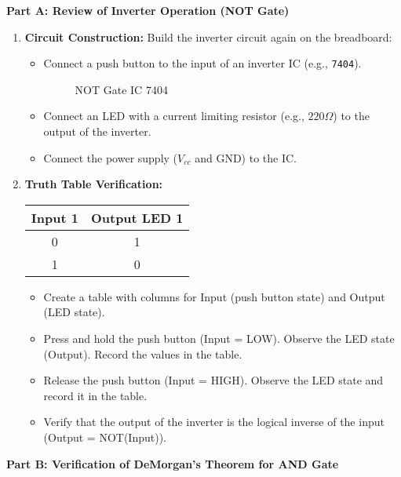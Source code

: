 \noindent \textbf{Part A: Review of Inverter Operation (NOT Gate)}
\begin{enumerate}
    \item \textbf{Circuit Construction:} Build the inverter circuit again on the breadboard:

    \begin{itemize}
        \item Connect a push button to the input of an inverter IC (e.g., \verb|7404|).
        \begin{figure}[H]
            \centering
            
            \caption{NOT Gate IC 7404}
            \label{fig:not_ic}
        \end{figure}
        \item Connect an LED with a current limiting resistor (e.g., $220\Omega$) to the output of the inverter.
        \item Connect the power supply ($V_{cc}$ and GND) to the IC.
    \end{itemize}
    \item \textbf{Truth Table Verification:}
    
    \begin{table}[h]
      \centering
      \begin{tabular}{c|c}
        \hline
        Input 1 & Output LED 1 \\
        \hline
        0 & 1 \\
        1 & 0 \\
        \hline
      \end{tabular}
      \label{tab:not_ic}
    \end{table}

\begin{itemize}
    \item Create a table with columns for Input (push button state) and Output (LED state).
    \item Press and hold the push button (Input = LOW). Observe the LED state (Output). Record the values in the table.
    \item Release the push button (Input = HIGH). Observe the LED state and record it in the table.
    \item Verify that the output of the inverter is the logical inverse of the input (Output = NOT(Input)).
\end{itemize}
\end{enumerate}

\noindent \textbf{Part B: Verification of DeMorgan's Theorem for AND Gate}


